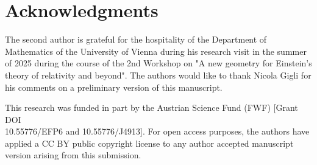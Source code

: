 \documentclass[a4paper,11pt]{article}
\numberwithin{equation}{section}
\theoremstyle{definition}
\theoremstyle{plain}
\begin{document}
\section*{Acknowledgments}

The second author is grateful for the hospitality of the Department of Mathematics of the University of Vienna during his research visit in the summer of 2025 during the course of the 2nd Workshop on "A new geometry for Einstein's theory of relativity and beyond". The authors would like to thank Nicola Gigli for his comments on a preliminary version of this manuscript.

This research was funded in part by the Austrian Science Fund (FWF) [Grant DOI\\10.55776/EFP6 and 10.55776/J4913]. For open access purposes, the authors have applied a CC BY public copyright license to any author accepted manuscript version arising from this submission.

 

%
\end{document}
